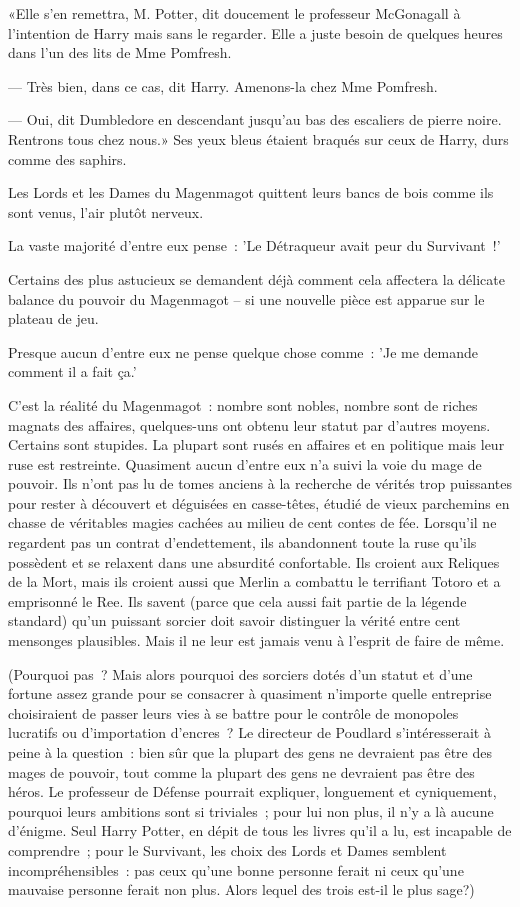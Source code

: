 «Elle s'en remettra, M. Potter, dit doucement le professeur McGonagall à l'intention de Harry mais sans le regarder. Elle a juste besoin de quelques heures dans l'un des lits de Mme Pomfresh.

--- Très bien, dans ce cas, dit Harry. Amenons-la chez Mme Pomfresh.

--- Oui, dit Dumbledore en descendant jusqu'au bas des escaliers de pierre noire. Rentrons tous chez nous.» Ses yeux bleus étaient braqués sur ceux de Harry, durs comme des saphirs.

\later

Les Lords et les Dames du Magenmagot quittent leurs bancs de bois comme ils sont venus, l'air plutôt nerveux.

La vaste majorité d'entre eux pense~: 'Le Détraqueur avait peur du Survivant~!'

Certains des plus astucieux se demandent déjà comment cela affectera la délicate balance du pouvoir du Magenmagot -- si une nouvelle pièce est apparue sur le plateau de jeu.

Presque aucun d'entre eux ne pense quelque chose comme~: 'Je me demande comment il a fait ça.'

C'est la réalité du Magenmagot~: nombre sont nobles, nombre sont de riches magnats des affaires, quelques-uns ont obtenu leur statut par d'autres moyens. Certains sont stupides. La plupart sont rusés en affaires et en politique mais leur ruse est restreinte. Quasiment aucun d'entre eux n'a suivi la voie du mage de pouvoir. Ils n'ont pas lu de tomes anciens à la recherche de vérités trop puissantes pour rester à découvert et déguisées en casse-têtes, étudié de vieux parchemins en chasse de véritables magies cachées au milieu de cent contes de fée. Lorsqu'il ne regardent pas un contrat d'endettement, ils abandonnent toute la ruse qu'ils possèdent et se relaxent dans une absurdité confortable. Ils croient aux Reliques de la Mort, mais ils croient aussi que Merlin a combattu le terrifiant Totoro et a emprisonné le Ree. Ils savent (parce que cela aussi fait partie de la légende standard) qu'un puissant sorcier doit savoir distinguer la vérité entre cent mensonges plausibles. Mais il ne leur est jamais venu à l'esprit de faire de même.

(Pourquoi pas~? Mais alors pourquoi des sorciers dotés d'un statut et d'une fortune assez grande pour se consacrer à quasiment n'importe quelle entreprise choisiraient de passer leurs vies à se battre pour le contrôle de monopoles lucratifs ou d'importation d'encres~? Le directeur de Poudlard s'intéresserait à peine à la question~: bien sûr que la plupart des gens ne devraient pas être des mages de pouvoir, tout comme la plupart des gens ne devraient pas être des héros. Le professeur de Défense pourrait expliquer, longuement et cyniquement, pourquoi leurs ambitions sont si triviales~; pour lui non plus, il n'y a là aucune d'énigme. Seul Harry Potter, en dépit de tous les livres qu'il a lu, est incapable de comprendre~; pour le Survivant, les choix des Lords et Dames semblent incompréhensibles~: pas ceux qu'une bonne personne ferait ni ceux qu'une mauvaise personne ferait non plus. Alors lequel des trois est-il le plus sage?)

